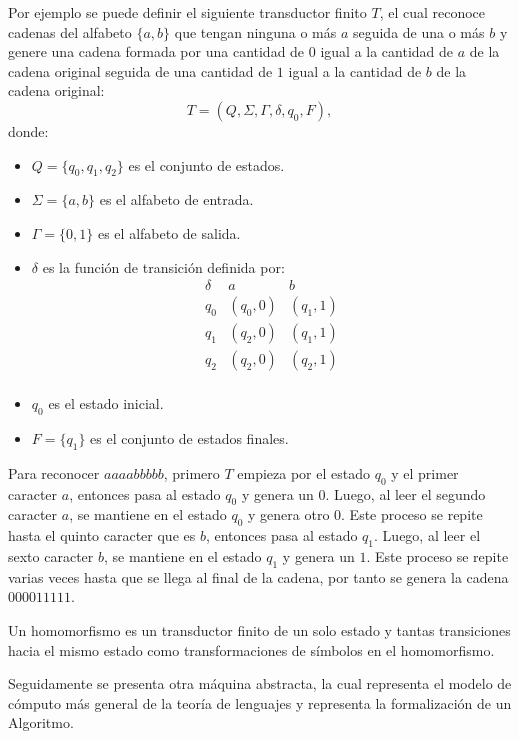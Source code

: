 \documentclass[12pt]{article}
\begin{document}
Por ejemplo se puede definir el siguiente transductor finito $T$, el cual reconoce cadenas del alfabeto $\{a,b\}$
que tengan ninguna o más $a$ seguida de una o más $b$ y genere una cadena formada por una cantidad de $0$ igual
a la cantidad de $a$ de la cadena original seguida de una cantidad de $1$ igual a la cantidad de $b$ de
la cadena original:
\[
  T = (Q, \Sigma, \Gamma, \delta, q_0, F),
\]
donde:
\begin{itemize}
  \item \(Q = \{q_0, q_1, q_2\}\) es el conjunto de estados.
  \item \(\Sigma = \{a, b\}\) es el alfabeto de entrada.
  \item \(\Gamma = \{0, 1\}\) es el alfabeto de salida.
  \item \(\delta\) es la función de transición definida por:
        \[
          \begin{array}{c|c|c}
            \delta & a        & b        \\
            \hline
            q_0    & (q_0, 0) & (q_1, 1) \\
            q_1    & (q_2, 0) & (q_1, 1) \\
            q_2    & (q_2, 0) & (q_2, 1) \\
          \end{array}
        \]
  \item \(q_0\) es el estado inicial.
  \item \(F = \{q_1\}\) es el conjunto de estados finales.
\end{itemize}

Para reconocer $aaaabbbbb$, primero $T$ empieza por el estado $q_0$ y el primer caracter $a$, entonces pasa al estado $q_0$ y genera un $0$.
Luego, al leer el segundo caracter $a$, se mantiene en el estado $q_0$ y genera otro $0$. Este proceso se repite hasta el quinto caracter
que es $b$, entonces pasa al estado $q_1$. Luego, al leer el sexto caracter $b$, se mantiene en el estado $q_1$ y genera un $1$. Este proceso
se repite varias veces hasta que se llega al final de la cadena, por tanto se genera la cadena $000011111$.

Un homomorfismo es un transductor finito de un solo estado y tantas transiciones hacia el mismo estado como transformaciones de símbolos en el homomorfismo.

Seguidamente se presenta otra máquina abstracta, la cual representa el modelo de cómputo más general de la teoría de lenguajes y 
representa la formalización de un Algoritmo.
\end{document}

